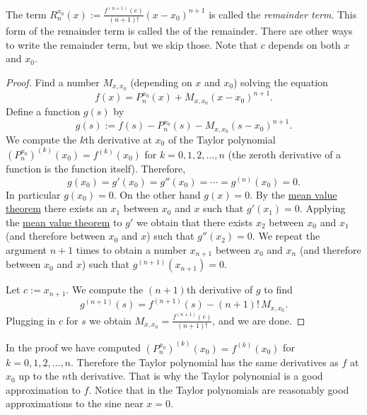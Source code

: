 The term $R_n^{x_0}(x):=\frac{f^{(n+1)}(c)}{(n+1)!}{(x-x_0)}^{n+1}$ is called the
\emph{remainder term}.  This
form 
of the remainder term is called the
\emph{} of the remainder.  There are other ways
to write the remainder term, but we skip those.  Note that $c$ depends on
both $x$ and $x_0$.

\begin{proof}
Find a number $M_{x,x_0}$ (depending on $x$ and $x_0$) solving the equation
\begin{equation*}
f(x)=P_{n}^{x_0}(x)+M_{x,x_0}{(x-x_0)}^{n+1} .
\end{equation*}
Define a function $g(s)$ by
\begin{equation*}
g(s) := f(s)-P_n^{x_0}(s)-M_{x,x_0}{(s-x_0)}^{n+1} .
\end{equation*}
We compute
the $k$th derivative at $x_0$ of the Taylor polynomial
${(P_n^{x_0})}^{(k)}(x_0) = f^{(k)}(x_0)$ for
$k=0,1,2,\ldots,n$ (the zeroth derivative of a function is the function
itself).  Therefore,
\begin{equation*}
g(x_0) = g'(x_0) = g''(x_0) = \cdots = g^{(n)}(x_0) = 0 .
\end{equation*}
In particular $g(x_0) = 0$.
On the other hand $g(x) = 0$.  By the
\hyperref[thm:mvt]{mean value theorem}
there exists an $x_1$ between $x_0$ and $x$ such that $g'(x_1) = 0$.
Applying the \hyperref[thm:mvt]{mean value theorem}
to $g'$ we obtain that there exists
$x_2$ between $x_0$ and $x_1$ (and therefore between $x_0$ and $x$)
such that $g''(x_2) = 0$.  We repeat the
argument $n+1$ times to obtain a number $x_{n+1}$ between $x_0$ and $x_n$
(and therefore between $x_0$ and $x$) such that $g^{(n+1)}(x_{n+1}) = 0$.

Let $c:=x_{n+1}$.
We compute the $(n+1)$th derivative of $g$ to find
\begin{equation*}
g^{(n+1)}(s) = f^{(n+1)}(s)-(n+1)!\,M_{x,x_0} .
\end{equation*}
Plugging in $c$ for $s$ we obtain $M_{x,x_0} = \frac{f^{(n+1)}(c)}{(n+1)!}$, and
we are done.
\end{proof}

In the proof we have computed 
${(P_n^{x_0})}^{(k)}(x_0) = f^{(k)}(x_0)$ for $k=0,1,2,\ldots,n$.
Therefore the Taylor polynomial has the same derivatives as $f$ at $x_0$
up to the $n$th derivative.  That is why the Taylor polynomial is
a good approximation to $f$.
Notice that in  the Taylor polynomials are
reasonably good approximations to the sine near $x=0$.

